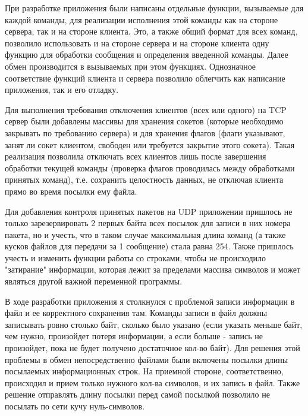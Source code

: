 При разработке приложения были написаны отдельные функции, вызываемые для каждой команды, для реализации исполнения этой команды как на стороне сервера, так и на стороне клиента. Это, а также общий формат для всех команд, позволило использовать и на стороне сервера и на стороне клиента одну функцию для обработки сообщения и определения введенной команды. Далее обмен производится в вызываемых при этом функциях. Однозначное соответствие функций клиента и сервера позволило облегчить как написание приложения, так и его отладку.

Для выполнения требования отключения клиентов (всех или одного) на TCP сервер были добавлены массивы для хранения сокетов (которые необходимо закрывать по требованию сервера) и для хранения флагов (флаги указывают, занят ли сокет клиентом, свободен или требуется закрытие этого сокета). Такая реализация позволила отключать всех клиентов лишь после завершения обработки текущей команды (проверка флагов проводилась между обработками принятых команд), т.е. сохранить целостность данных, не отключая клиента прямо во время посылки ему файла.

Для добавления контроля принятых пакетов на UDP приложении пришлось не только зарезервировать 2 первых байта всех посылок для записи в них номера пакета, но и учесть, что в таком случае максимальная длина команд (а также кусков файлов для передачи за 1 сообщение) стала равна 254. Также пришлось учесть и изменить функции работы со строками, чтобы не происходило "затирание" информации, которая лежит за пределами массива символов и может являться другой важной переменной программы.

В ходе разработки приложения я столкнулся с проблемой записи информации в файл и ее корректного сохранения там. Команды записи в файл должны записывать ровно столько байт, сколько было указано (если указать меньше байт, чем нужно, произойдет потеря информации, а если больше - запись не произойдет, пока не будет получено достаточное кол-во байт). Для решения этой проблемы в обмен непосредственно файлами были включены посылки длины посылаемых информационных строк. На приемной стороне, соответственно, происходил и прием только нужного кол-ва символов, и их запись в файл. Также решение отправлять длину посылки перед самой посылкой позволило не посылать по сети кучу нуль-символов.

